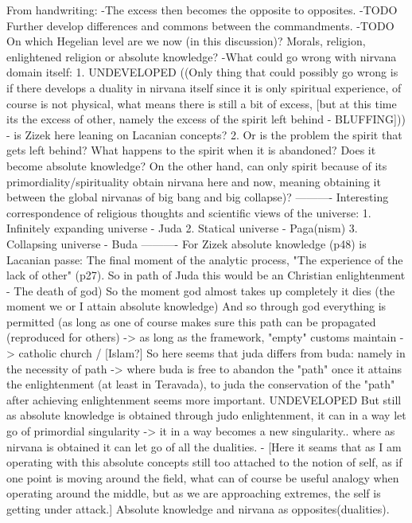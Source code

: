\documentclass[10pt]{book}
\begin{document}
From handwriting:
-The excess then becomes the opposite to opposites.
-TODO Further develop differences and commons between the commandments.
-TODO On which Hegelian level are we now (in this discussion)? Morals, religion, enlightened religion or absolute knowledge? 
-What could go wrong with nirvana domain itself:
1. UNDEVELOPED ((Only thing that could possibly go wrong is if there develops a duality in nirvana itself since it is only spiritual experience, of course is not physical, what means there is still a bit of excess, [but at this time its the excess of other, namely the excess of the spirit left behind - BLUFFING])) - is Zizek here leaning on Lacanian concepts?
2. Or is the problem the spirit that gets left behind? What happens to the spirit when it is abandoned? Does it become absolute knowledge? On the other hand, can only spirit because of its primordiality/spirituality obtain nirvana here and now, meaning obtaining it between the global nirvanas of big bang and big collapse)?
----------
Interesting correspondence of religious thoughts and scientific views of the universe:
1. Infinitely expanding universe - Juda
2. Statical universe - Paga(nism)
3. Collapsing universe - Buda
----------
For Zizek absolute knowledge (p48) is Lacanian passe: 
The final moment of the analytic process, "The experience of the lack of other" (p27). So in path of Juda this would be an Christian enlightenment - The death of god) So the moment god almost takes up completely it dies (the moment we or I attain absolute knowledge) And so through god everything is permitted (as long as one of course makes sure this path can be propagated (reproduced for others) -> as long as the framework, "empty" customs maintain -> catholic church / [Islam?]
So here seems that juda differs from buda: namely in the necessity of path -> where buda is free to abandon the "path" once it attains the enlightenment (at least in Teravada), to juda the conservation of the "path" after achieving enlightenment seems more important.
UNDEVELOPED But still as absolute knowledge is obtained through judo enlightenment, it can in a way let go of primordial singularity -> it in a way becomes a new singularity.. where as nirvana is obtained it can let go of all the dualities. - [Here it seams that as I am operating with this absolute concepts still too attached to the notion of self, as if one point is moving around the field, what can of course be useful analogy when operating around the middle, but as we are approaching extremes, the self is getting under attack.]
Absolute knowledge and nirvana as opposites(dualities).
\end{document}
